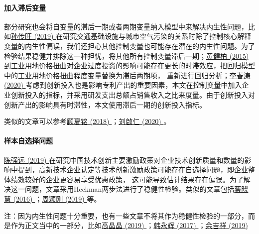 \documentclass[11pt,a4paper]{ctexart}
\begin{document}
\paragraph{加入滞后变量}

部分研究也会将自变量的滞后一期或者两期变量纳入模型中来解决内生性问题，比如\href{https://xueshu.baidu.com/usercenter/paper/show?paperid=1e2c0820qa0900c0cg270m007d398523&site=xueshu_se}{孙传旺
(2019)
}在研究交通基础设施与城市空气污染的关系时除了控制核心解释变量的内生性偏误，我们还担心其他控制变量也可能存在潜在的内生性问题。为了检验结果稳健并排除这一种担忧，将其他所有控制变量滞后一期；\href{https://xueshu.baidu.com/usercenter/paper/show?paperid=222c0f602615a1d342d220261aeb1429&site=xueshu_se}{黄健柏
(2015)
}到工业用地价格扭曲对企业过度投资的影响可能存在更长的时滞效应，把回归模型中的工业用地价格扭曲程度变量替换为滞后两期项，
重新进行回归分析；\href{https://xueshu.baidu.com/usercenter/paper/show?paperid=e116045880d5f16366d33f6da8e8dc66&site=xueshu_se}{李春涛
(2020)
}考虑到创新投入也是影响专利产出的重要因素，本文在控制变量中加入企业创新投入的指标，并采用研发支出总额占销售收入之比来度量。由于创新投入对创新产出的影响具有时滞性，本文使用滞后一期的创新投入指标。

类似的文章可以参考\href{https://xueshu.baidu.com/usercenter/paper/show?paperid=6f34956fcbe0e795413e03179f070103&site=xueshu_se}{顾夏铭
(2018)
}；\href{https://xueshu.baidu.com/usercenter/paper/show?paperid=9e6588d93f28008df07c5e43d7e29211&site=xueshu_se&hitarticle=1}{刘啟仁
(2020) }。

\paragraph{样本自选择问题}

\href{https://xueshu.baidu.com/usercenter/paper/show?paperid=1u2906s0cs5t04m0dq5s0jc0wy341674&site=xueshu_se&hitarticle=1}{陈强远
(2019)
}在研究中国技术创新主要激励政策对企业技术创新质量和数量的影响中提到，高新技术企业认定等技术创新激励政策可能存在自选择问题，即企业整体绩效较好的企业更容易享受优惠政策，
这可能导致估计结果存在偏误。为了解决这一问题，文章采用Heckman两步法进行了稳健性检验。类似的文章包括\href{https://xueshu.baidu.com/usercenter/paper/show?paperid=0f2b233eb96ada98f02353ef66f55944&site=xueshu_se}{蔡晓慧
(2016)
}；\href{https://xueshu.baidu.com/usercenter/paper/show?paperid=1f5s0rq0630m0230545504p0bv194162&site=xueshu_se}{周颖刚
(2019) }等。

注：因为内生性问题十分重要，也有一些文章不将其作为稳健性检验的一部分，而是作为正文当中的一部分，比如\href{https://xueshu.baidu.com/usercenter/paper/show?paperid=183a04j0pt5c0r50r05n0cn08p653420&site=xueshu_se}{高晶晶
(2019)
}；\href{https://xueshu.baidu.com/usercenter/paper/show?paperid=b8878359c278ad203f6089cb0abc23ef&site=xueshu_se}{韩永辉
(2017)
}；\href{https://kns.cnki.net/KCMS/detail/detail.aspx?dbcode=CJFQ&dbname=CJFDLAST2019&filename=JJYJ201904009&uid=WEEvREcwSlJHSldRa1FhcTdnTnhYWUN2MXhCUHFoYmd1L1VuUFFrTFVKQT0=$9A4hF_YAuvQ5obgVAqNKPCYcEjKensW4IQMovwHtwkF4VYPoHbKxJw!!&v=MDgyMzhSOGVYMUx1eFlTN0RoMVQzcVRyV00xRnJDVVI3cWZZT1J0RnlIbVU3ckFMeWZTWkxHNEg5ak1xNDlGYlk=}{余吉祥
(2019)}
\end{document}
